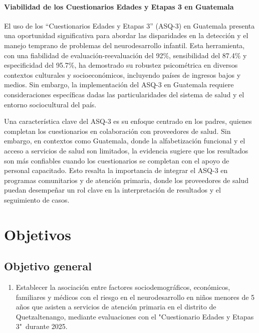 \documentclass[11pt,letterpaper]{report}
\newcommand{\asq}{"Cuestionario Edades y Etapas 3"}
\begin{document}
\subsubsection{Viabilidad de los Cuestionarios Edades y Etapas 3 en Guatemala}
El uso de los ``Cuestionarios Edades y Etapas 3'' (ASQ-3) en Guatemala presenta
una oportunidad significativa para abordar las disparidades en la detección y
el manejo temprano de problemas del neurodesarrollo infantil. Esta herramienta,
con una fiabilidad de evaluación-reevaluación del 92\%, sensibilidad del 87.4\%
y especificidad del 95.7\%, ha demostrado su robustez psicométrica en diversos
contextos culturales y socioeconómicos, incluyendo países de ingresos bajos y
medios. Sin embargo, la implementación del ASQ-3 en Guatemala requiere
consideraciones específicas dadas las particularidades del sistema de salud y
el entorno sociocultural del país. \cite{Vameghi2013-uo, Manasyan2023}

Una característica clave del ASQ-3 es su enfoque centrado en los padres,
quienes completan los cuestionarios en colaboración con proveedores de salud.
Sin embargo, en contextos como Guatemala, donde la alfabetización funcional y
el acceso a servicios de salud son limitados, la evidencia sugiere que los
resultados son más confiables cuando los cuestionarios se completan con el
apoyo de personal capacitado. Esto resalta la importancia de integrar el ASQ-3
en programas comunitarios y de atención primaria, donde los proveedores de
salud puedan desempeñar un rol clave en la interpretación de resultados y el
seguimiento de casos. \cite{Manasyan2023, Colbert2021}

	\chapter{Objetivos}
\section{Objetivo general}
	\begin{enumerate}
		\item Establecer la asociación entre factores sociodemográficos,
		económicos, familiares y médicos con el riesgo en el neurodesarrollo en
		niños menores de 5 años que asisten a servicios de atención primaria en
		el distrito de Quetzaltenango, mediante evaluaciones con el \asq\
		durante 2025.
	\end{enumerate}
\end{document}

